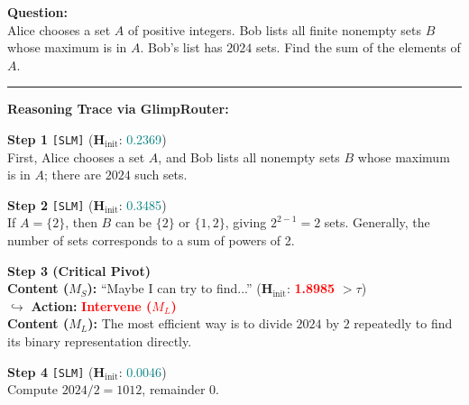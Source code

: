 \documentclass[11pt]{article}
\newcommand{\approach}{{GlimpRouter}\xspace}
\begin{document}
\begin{tcolorbox}[
    breakable,
    colback=white,       %
    colframe=gray!60,    %
    boxrule=0.8pt,       %
    arc=2mm,
    fonttitle=\bfseries,
    coltitle=black,
    title={A Case of Correlation between Initial Token Entropy ($\mathbf{H}_\text{init}$) and Reasoning Difficulty}
]
\small

\textbf{Question:} \\
Alice chooses a set $A$ of positive integers. Bob lists all finite nonempty sets $B$ whose maximum is in $A$. Bob's list has $2024$ sets. Find the sum of the elements of $A$.

\vspace{0.2cm}
\hrule
\vspace{0.2cm}

\textbf{Reasoning Trace via \approach:}

\noindent \textbf{Step 1} \texttt{[SLM]} {\scriptsize ($\mathbf{H}_\text{init}$: \textcolor{teal}{0.2369})} \\
First, Alice chooses a set $A$, and Bob lists all nonempty sets $B$ whose maximum is in $A$; there are $2024$ such sets.

\noindent \textbf{Step 2} \texttt{[SLM]} {\scriptsize ($\mathbf{H}_\text{init}$: \textcolor{teal}{0.3485})} \\
If $A=\{2\}$, then $B$ can be $\{2\}$ or $\{1,2\}$, giving $2^{2-1}=2$ sets. Generally, the number of sets corresponds to a sum of powers of 2.

\vspace{0.1cm}
\noindent \colorbox{red!10}{\parbox{\dimexpr\linewidth-6pt}{
\textbf{Step 3 (Critical Pivot)} \\
\textbf{Content ($M_S$):} ``Maybe I can try to find...'' {\scriptsize ($\mathbf{H}_\text{init}$: \textcolor{red}{\textbf{1.8985}} $> \tau$)} \\
$\hookrightarrow$ \textbf{Action:} \textcolor{red}{\textbf{Intervene ($M_L$)}} \\
\textbf{Content ($M_L$):} The most efficient way is to divide $2024$ by $2$ repeatedly to find its binary representation directly.
}}
\vspace{0.1cm}

\noindent \textbf{Step 4} \texttt{[SLM]} {\scriptsize ($\mathbf{H}_\text{init}$: \textcolor{teal}{0.0046})} \\
Compute $2024/2=1012$, remainder $0$.


\end{tcolorbox}
\end{document}
